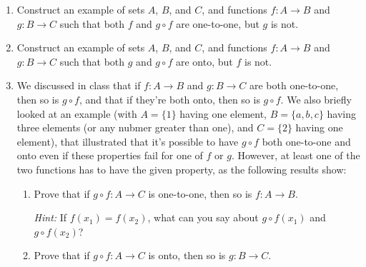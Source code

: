 \documentclass[letterpaper,12pt]{article}
\begin{document}
\begin{enumerate}
\item Construct an example of sets $A$, $B$, and $C$, and functions $f:A\to B$ and $g:B\to C$ such that both $f$ and $g\circ f$ are one-to-one, but $g$ is not.
\item Construct an example of sets $A$, $B$, and $C$, and functions $f:A\to B$ and $g:B\to C$ such that both $g$ and $g\circ f$ are onto, but $f$ is not.
\item We discussed in class that if $f:A\to B$ and $g:B\to C$ are both one-to-one, then so is $g\circ f$, and that if they're both onto, then so is $g\circ f$. We also briefly looked at an example (with $A=\{1\}$ having one element, $B=\{a,b,c\}$ having three elements (or any nubmer greater than one), and $C=\{2\}$ having one element), that illustrated that it's possible to have $g\circ f$ both one-to-one and onto even if these properties fail for one of $f$ or $g$. However, at least one of the two functions has to have the given property, as the following results show:
\begin{enumerate}
 \item Prove that if $g\circ f:A\to C$ is one-to-one, then so is $f:A\to B$.

{\em Hint:} If $f(x_1)=f(x_2)$, what can you say about $g\circ f(x_1)$ and $g\circ f(x_2)$?

 \item Prove that if $g\circ f:A\to C$ is onto, then so is $g:B\to C$.
\end{enumerate}


\end{enumerate}
\end{document}
